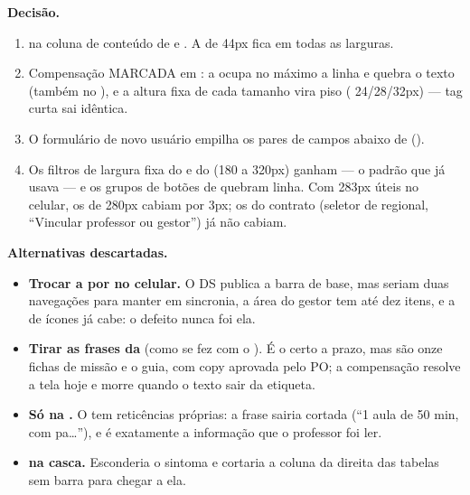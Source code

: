 \textbf{Decisão.}
\begin{enumerate}
  \item {} na coluna de conteúdo de  e
    . A  de 44px fica em todas as larguras.
  \item Compensação MARCADA em : a
     ocupa no máximo a linha e quebra o texto (também no
    ), e a altura fixa de cada tamanho vira piso
    ( 24/28/32px) --- tag curta sai idêntica.
  \item O formulário de novo usuário empilha os pares de campos abaixo de
     ().
  \item Os filtros de largura fixa do  e do  (180 a
    320px) ganham  --- o padrão que 
    já usava --- e os grupos de botões de  quebram linha.
    Com 283px úteis no celular, os de 280px cabiam por 3px; os do contrato
    (seletor de regional, \enquote{Vincular professor ou gestor}) já não cabiam.
\end{enumerate}

\textbf{Alternativas descartadas.}
\begin{itemize}
  \item \textbf{Trocar a  por  no celular.} O DS
    publica a barra de base, mas seriam duas navegações para manter em
    sincronia, a área do gestor tem até dez itens, e a  de ícones
    já cabe: o defeito nunca foi ela.
  \item \textbf{Tirar as frases da } (como se fez com o
    ). É o certo a prazo, mas são onze fichas de missão e o
    guia, com copy aprovada pelo PO; a compensação resolve a tela hoje e morre
    quando o texto sair da etiqueta.
  \item \textbf{Só  na .} O  tem reticências
    próprias: a frase sairia cortada (\enquote{1 aula de 50 min, com pa\ldots}),
    e é exatamente a informação que o professor foi ler.
  \item \textbf{ na casca.} Esconderia o sintoma e
    cortaria a coluna da direita das tabelas sem barra para chegar a ela.
\end{itemize}

